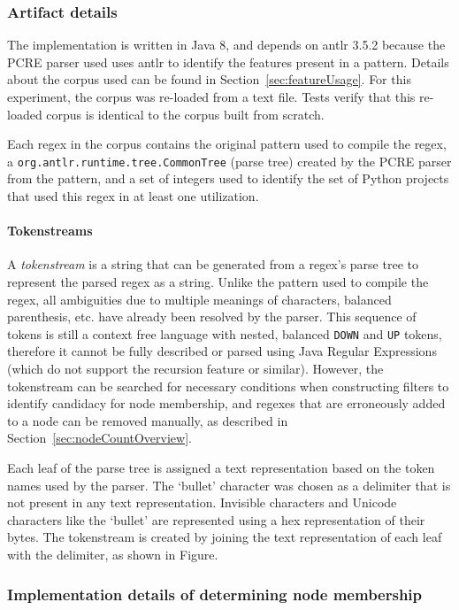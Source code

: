 \subsubsection{Artifact details}
\label{sec:nodeCountImplementation}
The implementation is written in Java 8, and depends on antlr 3.5.2 because the PCRE parser used uses antlr to identify the features present in a pattern.  Details about the corpus used can be found in Section~\ref{sec:featureUsage}.  For this experiment, the corpus was re-loaded from a text file.  Tests verify that this re-loaded corpus is identical to the corpus built from scratch.

Each regex in the corpus contains the original pattern used to compile the regex, a {\tt org.antlr.runtime.tree.CommonTree} (parse tree) created by the PCRE parser from the pattern, and a set of integers used to identify the set of Python projects that used this regex in at least one utilization.

\paragraph{Tokenstreams}
A \emph{tokenstream} is a string that can be generated from a regex's parse tree to represent the parsed regex as a string. Unlike the pattern used to compile the regex, all ambiguities due to multiple meanings of characters, balanced parenthesis, etc. have already been resolved by the parser. This sequence of tokens is still a context free language with nested, balanced \verb!DOWN! and \verb!UP! tokens, therefore it cannot be fully described or parsed using Java Regular Expressions (which do not support the recursion feature or similar).  However, the tokenstream can be searched for necessary conditions when constructing filters to identify candidacy for node membership, and regexes that are erroneously added to a node can be removed manually, as described in Section~\ref{sec:nodeCountOverview}.

Each leaf of the parse tree is assigned a text representation based on the token names used by the parser.  The `bullet' character was chosen as a delimiter that is not present in any text representation.  Invisible characters and Unicode characters like the `bullet' are represented using a hex representation of their bytes.  The tokenstream is created by joining the text representation of each leaf with the delimiter, as shown in Figure.


\subsubsection{Implementation details of determining node membership}


